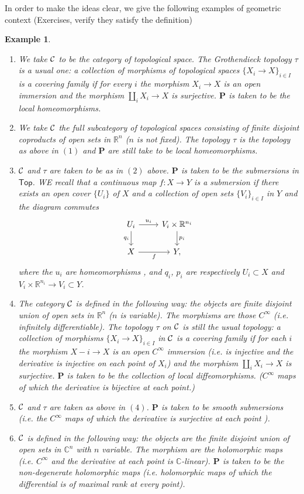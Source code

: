 \documentclass{tufte-book} %
\numberwithin{dummy}{section}
\newtheorem{ex}[thm]{Example}
\newcommand{\reals}{\mathbb R}
\newcommand{\cplx}{\mathbb C}
\newcommand{\calc}{{\cal C}}
\newcommand{\lrta}{\longrightarrow}
\newcommand{\bfp}{\mathbf{P}}
\begin{document}
In order to make the ideas clear, we give the following examples of geometric context (Exercises, verify they satisfy the definition)
\begin{ex}\label{ex:geometric_context}\ 
\begin{enumerate}[label=(\arabic*)]
  \item
We take $\calc$ to be the category of topological space. The Grothendieck topology $\tau$ is a usual one: a collection of morphisms of topological spaces $\{X_i\lrta X\}_{i\in I}$ is a covering family if for every $i$ the morphism $X_i\lrta X$ is an open immersion and the morphism $\coprod_i X_i\lrta X$ is surjective. $\bfp$ is taken to be the local homeomorphisms.
\item We take $\calc$ the full subcategory of topological spaces consisting of finite disjoint coproducts of open sets in $\reals^n$ ($n$ is not fixed). The topology $\tau$ is the topology as above in $(1)$ and $\bfp$ are still take to be local homeomorphisms.
\item $\calc$ and $\tau$ are taken to be as in $(2)$ above. $\bfp$ is taken to be the submersions in $\mathsf{Top}$. WE recall that a continuous map $f: X\lrta Y$ is a submersion if there exists an open cover $\{U_i\}$ of $X$ and a collection of open sets $\{V_i\}_{i\in I}$ in $Y$ and the diagram commutes
$$
\begin{tikzcd}
U_i \arrow[d, "q_i"'] \arrow[r, "u_i"] & V_i\times \reals^{n_i} \arrow[d, "p_i"] \\
X \arrow[r, "f"'] & Y,
\end{tikzcd}
$$
where the $u_i$ are homeomorphisms , and $q_i$, $p_i$ are respectively $U_i\subset X$ and $V_i\times \reals^{n_i}\lrta V_i\subset Y$.
\item The category $\calc$ is defined in the following way: the objects are finite disjoint union of open sets in $\reals^n$ ($n$ is variable). The morphisms are those $C^\infty$ (i.e. infinitely differentiable). The topology $\tau$ on $\calc$ is still the usual topology: a collection of morphisms $\{X_i\lrta X\}_{i\in I}$ in $\calc$ is a covering family if for each $i$ the morphism $X-i\lrta X$ is an open $C^\infty$ immersion (i.e. is injective and the derivative is injective on each point of $X_i$) and the morphism $\coprod_i X_i\lrta X$ is surjective. $\bfp$ is taken to be the collection of local diffeomorphisms. ($C^\infty$ maps of which the derivative is bijective at each point.)
\item $\calc$ and $\tau$ are taken as above in $(4)$. $\bfp$ is taken to be smooth submersions (i.e. the $C^\infty$ maps of which the derivative is surjective at each point ).
\item $\calc$ is defined in the following way: the objects are the finite disjoint union of open sets in $\cplx^n$ with $n$ variable. The morphism are the holomorphic maps (i.e. $C^\infty$ and the derivative at each point is $\cplx$-linear). $\bfp$ is taken to be the non-degenerate holomorphic maps (i.e. holomorphic maps of which the differential is of maximal rank at every point).
\end{enumerate}
\end{ex}
\end{document}
